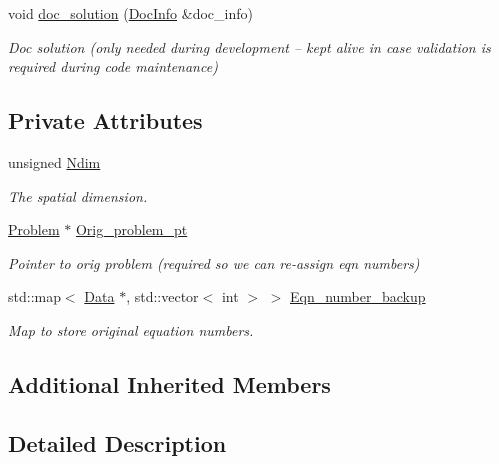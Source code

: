 \begin{DoxyCompactItemize}
void \hyperlink{classoomph_1_1FpPressureAdvectionDiffusionProblem_aa58589dc1ce278655255588f0006b530}{doc\+\_\+solution} (\hyperlink{classoomph_1_1DocInfo}{Doc\+Info} \&doc\+\_\+info)
\begin{DoxyCompactList}\small\item\em Doc solution (only needed during development -- kept alive in case validation is required during code maintenance) \end{DoxyCompactList}\end{DoxyCompactItemize}
\subsection*{Private Attributes}
\begin{DoxyCompactItemize}
\item 
unsigned \hyperlink{classoomph_1_1FpPressureAdvectionDiffusionProblem_a026383763af2a00ca7c9052f10098375}{Ndim}
\begin{DoxyCompactList}\small\item\em The spatial dimension. \end{DoxyCompactList}\item 
\hyperlink{classoomph_1_1Problem}{Problem} $\ast$ \hyperlink{classoomph_1_1FpPressureAdvectionDiffusionProblem_aa39f26d35ad196059b7be871d77f04cc}{Orig\+\_\+problem\+\_\+pt}
\begin{DoxyCompactList}\small\item\em Pointer to orig problem (required so we can re-\/assign eqn numbers) \end{DoxyCompactList}\item 
std\+::map$<$ \hyperlink{classoomph_1_1Data}{Data} $\ast$, std\+::vector$<$ int $>$ $>$ \hyperlink{classoomph_1_1FpPressureAdvectionDiffusionProblem_ad2e52d2785ab08702684bab80542bbd8}{Eqn\+\_\+number\+\_\+backup}
\begin{DoxyCompactList}\small\item\em Map to store original equation numbers. \end{DoxyCompactList}\end{DoxyCompactItemize}
\subsection*{Additional Inherited Members}


\subsection{Detailed Description}
